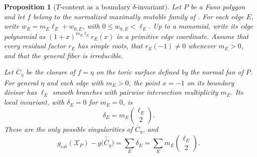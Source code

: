 \documentclass[11pt]{article}
\theoremstyle{plain}
\newtheorem{proposition}[theorem]{Proposition}
\theoremstyle{definition}
\theoremstyle{remark}
\newcommand{\1}{\mathbf 1}
\begin{document}
\begin{samepage}
\begin{proposition}[$T$-content as a boundary $\delta$-invariant]\label{prop:boundary-delta}
Let $P$ be a Fano polygon and let $f$ belong to the normalized maximally mutable family of \cite[Propositions 3.7 and 3.9]{CKPT}.  For each edge $E$, write $w_E=m_E\ell_E+w_{0,E}$, with $0\le w_{0,E}<\ell_E$.  Up to a monomial, write its edge polynomial as $(1+x)^{m_E\ell_E}r_E(x)$ in a primitive edge coordinate.  Assume that every residual factor $r_E$ has simple roots, that $r_E(-1)\ne0$ whenever $m_E>0$, and that the general fiber is irreducible.

Let $\overline C_\eta$ be the closure of $f=\eta$ on the toric surface defined by the normal fan of $P$.  For general $\eta$ and each edge with $m_E>0$, the point $x=-1$ on its boundary divisor has $\ell_E$ smooth branches with pairwise intersection multiplicity $m_E$.  Its local invariant, with $\delta_E=0$ for $m_E=0$, is
\[
\boxed{\delta_E=m_E\binom{\ell_E}{2}.}
\]
These are the only possible singularities of $\overline C_\eta$, and
\[
\boxed{
g_{\mathrm{cat}}(\mathcal X_P)-g\bigl(\widetilde{\overline C_\eta}\bigr)
=\sum_E\delta_E=\sum_E m_E\binom{\ell_E}{2}.}
\]
\end{proposition}
\end{samepage}
\end{document}
